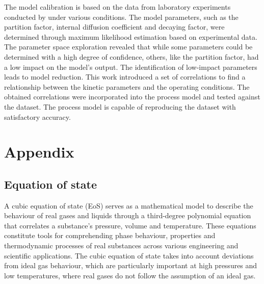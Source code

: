 \documentclass[a4paper,fleqn]{cas-dc}
\begin{document}
The model calibration is based on the data from laboratory experiments conducted by \citet{Povh2001} under various conditions. The model parameters, such as the partition factor, internal diffusion coefficient and decaying factor, were determined through maximum likelihood estimation based on experimental data. The parameter space exploration revealed that while some parameters could be determined with a high degree of confidence, others, like the partition factor, had a low impact on the model's output. The identification of low-impact parameters leads to model reduction. This work introduced a set of correlations to find a relationship between the kinetic parameters and the operating conditions. The obtained correlations were incorporated into the process model and tested against the dataset. The process model is capable of reproducing the dataset with satisfactory accuracy.


\clearpage
%



\clearpage \appendix \label{appendix}
\section{Appendix} 

\label{CH: Thermodynamic_details}

\subsection{Equation of state} \label{subsubsec: Equation of state}

A cubic equation of state (EoS) serves as a mathematical model to describe the behaviour of real gases and liquids through a third-degree polynomial equation that correlates a substance's pressure, volume and temperature. These equations constitute tools for comprehending phase behaviour, properties and thermodynamic processes of real substances across various engineering and scientific applications. The cubic equation of state takes into account deviations from ideal gas behaviour, which are particularly important at high pressures and low temperatures, where real gases do not follow the assumption of an ideal gas.
\end{document}
